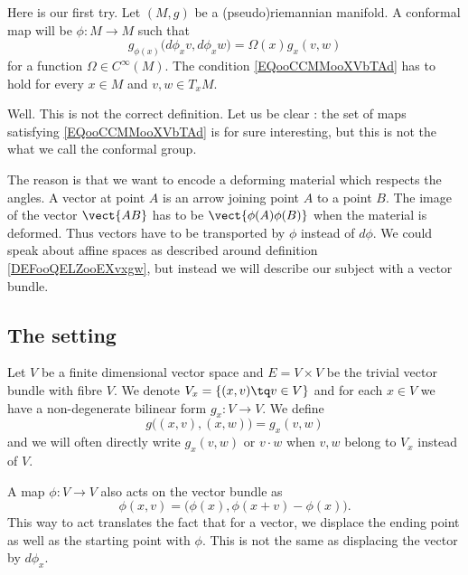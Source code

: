 \begin{normaltext}
Here is our first try. Let \( (M,g)\) be a (pseudo)riemannian manifold. A conformal map will be \( \phi\colon M\to M\) such that
\begin{equation}        \label{EQooCCMMooXVbTAd}
    g_{\phi(x)}\big( d\phi_xv,d\phi_xw \big)=\Omega(x)g_x(v,w)
\end{equation}
for a function \( \Omega\in C^{\infty}(M)\). The condition \eqref{EQooCCMMooXVbTAd} has to hold for every \( x\in M\) and \( v,w\in T_xM\).
\end{normaltext}
    

\begin{normaltext}
Well. This is not the correct definition. Let us be clear : the set of maps satisfying \eqref{EQooCCMMooXVbTAd} is for sure interesting, but this is not the what we call the conformal group.

The reason is that we want to encode a deforming material which respects the angles. A vector at point \( A\) is an arrow joining point \( A\) to a point \( B\). The image of the vector \( \vect{ AB }\) has to be \( \vect{ \phi(A)\phi(B) }\) when the material is deformed. Thus vectors have to be transported by \( \phi\) instead of \( d\phi\). We could speak about affine spaces as described around definition \ref{DEFooQELZooEXvxgw}, but instead we will describe our subject with a vector bundle.
\end{normaltext}

\subsection{The setting}

Let \( V\) be a finite dimensional vector space and \( E=V\times V\) be the trivial vector bundle with fibre \( V\). We denote \( V_x=\{ (x,v)\tq v\in V \}\) and for each \( x\in V\) we have a non-degenerate bilinear form \( g_x\colon V\to V\). We define
\begin{equation}
    g\big( (x,v),(x,w) \big)=g_x(v,w)
\end{equation}
and we will often directly write \( g_x(v,w)\) or \( v\cdot w\) when \( v,w\) belong to \(V_x\) instead of \( V\).

A map \( \phi\colon V\to V\) also acts on the vector bundle as
\begin{equation}
    \phi(x,v)=\big( \phi(x),\phi(x+v)-\phi(x) \big).
\end{equation}
This way to act translates the fact that for a vector, we displace the ending point as well as the starting point with \( \phi\). This is not the same as displacing the vector by \( d\phi_x\).

